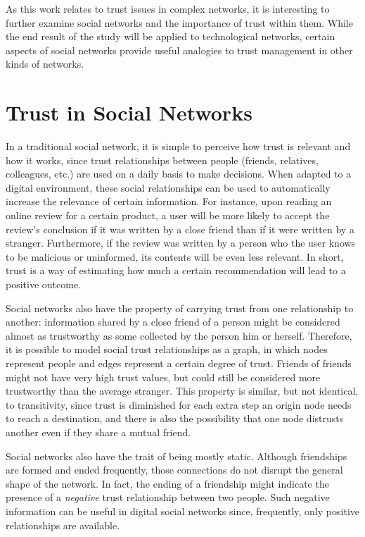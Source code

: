 As this work relates to trust issues in complex networks, it is interesting to further examine social networks and the importance of trust within them.
While the end result of the study will be applied to technological networks, certain aspects of social networks provide useful analogies to trust management in other kinds of networks.

\section{Trust in Social Networks}
\label{section:trustsocial}
In a traditional social network, it is simple to perceive how trust is relevant and how it works, since trust relationships between people (friends, relatives, colleagues, etc.) are used on a daily basis to make decisions.
When adapted to a digital environment, these social relationships can be used to automatically increase the relevance of certain information.
For instance, upon reading an online review for a certain product, a user will be more likely to accept the review's conclusion if it was written by a close friend than if it were written by a stranger.
Furthermore, if the review was written by a person who the user knows to be malicious or uninformed, its contents will be even less relevant.
In short, trust is a way of estimating how much a certain recommendation will lead to a positive outcome. \cite{golbeck2006inferring}

Social networks also have the property of carrying trust from one relationship to another:
information shared by a close friend of a person might be considered almost as trustworthy as some collected by the person him or herself.
Therefore, it is possible to model social trust relationships as a graph, in which nodes represent people and edges represent a certain degree of trust.
Friends of friends \cite{boissevain1974friends} might not have very high trust values, but could still be considered more trustworthy than the average stranger.
This property is similar, but not identical, to transitivity, since trust is diminished for each extra step an origin node needs to reach a destination, and there is also the possibility that one node distrusts another even if they share a mutual friend.

Social networks also have the trait of being mostly static.
Although friendships are formed and ended frequently, those connections do not disrupt the general shape of the network.
In fact, the ending of a friendship might indicate the presence of a \textit{negative} trust relationship between two people.
Such negative information can be useful in digital social networks since, frequently, only positive relationships are available.

